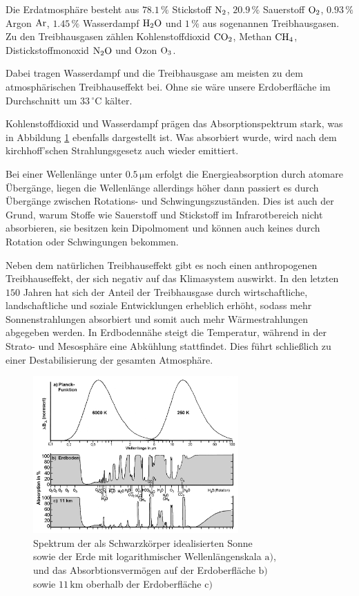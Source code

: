 \documentclass[12pt,a4paper]{scrartcl}
\numberwithin{equation}{section} %
\begin{document}
Die Erdatmosphäre besteht aus $78.1\,\%$ Stickstoff $\ce{N_2}$, $20.9\,\%$ Sauerstoff $\ce{O_2}$, $0.93\,\%$ Argon $\ce{Ar}$, $1.45\,\%$ Wasserdampf $\ce{H_2O}$ und $1\,\%$ aus sogenannen Treibhausgasen. Zu den Treibhausgasen zählen Kohlenstoffdioxid $\ce{CO_2}$, Methan $\ce{CH_4}$, Distickstoffmonoxid $\ce{N_2O}$ und Ozon $\ce{O_3}$.

Dabei tragen Wasserdampf und die Treibhausgase am meisten zu dem atmosphärischen Treibhauseffekt bei. Ohne sie wäre unsere Erdoberfläche im Durchschnitt um $33\mathrm{\,^\circ C}$ kälter. \cite{BakanRaschke}

Kohlenstoffdioxid und Wasserdampf prägen das Absorptionspektrum stark, was in Abbildung \ref{abb:Spektrum Sonne & Erde} ebenfalls dargestellt ist. Was absorbiert wurde, wird nach dem kirchhoff'schen Strahlungsgesetz auch wieder emittiert.

Bei einer Wellenlänge unter $0.5\mathrm{\,\mu m}$ erfolgt die Energieabsorption durch atomare Übergänge, liegen die Wellenlänge allerdings höher dann passiert es durch Übergänge zwischen Rotations- und Schwingungszuständen. Dies ist auch der Grund, warum Stoffe wie Sauerstoff und Stickstoff im Infrarotbereich nicht absorbieren, sie besitzen kein Dipolmoment und können auch keines durch Rotation oder Schwingungen bekommen. \cite{BakanRaschke}

Neben dem natürlichen Treibhauseffekt gibt es noch einen anthropogenen Treibhauseffekt, der sich negativ auf das Klimasystem auswirkt. In den letzten $150$ Jahren hat sich der Anteil der Treibhausgase durch wirtschaftliche, landschaftliche und soziale Entwicklungen erheblich erhöht, sodass mehr Sonnenstrahlungen absorbiert und somit auch mehr Wärmestrahlungen abgegeben werden. In Erdbodennähe steigt die Temperatur, während in der Strato- und Mesosphäre eine Abkühlung stattfindet. Dies führt schließlich zu einer Destabilisierung der gesamten Atmosphäre. \cite{BakanRaschke}

\begin{figure}[h!]
	\centering
	\includegraphics[width=0.7\textwidth]{../media/B1.1/Spektrum_Sonne_Erde.png}
	\caption{Spektrum der als Schwarzkörper idealisierten Sonne\\
		sowie der Erde mit logarithmischer Wellenlängenskala $\mathrm a)$,\\
		und das Absorbtionsvermögen auf der Erdoberfläche $\mathrm b)$\\
		sowie $11\mathrm{\,km}$ oberhalb der Erdoberfläche $\mathrm c)$ \cite{GoodyYung}}
	\label{abb:Spektrum Sonne & Erde}
\end{figure}
\end{document}
